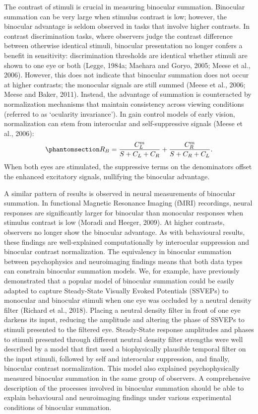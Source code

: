 \documentclass[
  12pt,
]{article}
\begin{document}
The contrast of stimuli is crucial in measuring binocular summation.
Binocular summation can be very large when stimulus contrast is low;
however, the binocular advantage is seldom observed in tasks that
involve higher contrasts. In contrast discrimination tasks, where
observers judge the contrast difference between otherwise identical
stimuli, binocular presentation no longer confers a benefit in
sensitivity: discrimination thresholds are identical whether stimuli are
shown to one eye or both (Legge, 1984a; Maehara and Goryo, 2005; Meese
et al., 2006). However, this does not indicate that binocular summation
does not occur at higher contrasts; the monocular signals are still
summed (Meese et al., 2006; Meese and Baker, 2011). Instead, the
advantage of summation is counteracted by normalization mechanisms that
maintain consistency across viewing conditions (referred to as
`ocularity invariance'). In gain control models of early vision,
normalization can stem from interocular and self-suppressive signals
(Meese et al., 2006):
\begin{equation}\phantomsection\label{eq-intoMath2}{
R_B = \frac{C_L^m}{S+C_L+C_R} + \frac{C_R^m}{S+C_R+C_L}.
}\end{equation} When both eyes are stimulated, the suppressive terms on
the denominators offset the enhanced excitatory signals, nullifying the
binocular advantage.

A similar pattern of results is observed in neural measurements of
binocular summation. In functional Magnetic Resonance Imaging (fMRI)
recordings, neural responses are significantly larger for binocular than
monocular responses when stimulus contrast is low (Moradi and Heeger,
2009). At higher contrasts, observers no longer show the binocular
advantage. As with behavioural results, these findings are
well-explained computationally by interocular suppression and binocular
contrast normalization. The equivalency in binocular summation between
psychophysics and neuroimaging findings means that both data types can
constrain binocular summation models. We, for example, have previously
demonstrated that a popular model of binocular summation could be easily
adapted to capture Steady-State Visually Evoked Potentials (SSVEPs) to
monocular and binocular stimuli when one eye was occluded by a neutral
density filter (Richard et al., 2018). Placing a neutral density filter
in front of one eye darkens its input, reducing the amplitude and
altering the phase of SSVEPs to stimuli presented to the filtered eye.
Steady-State response amplitudes and phases to stimuli presented through
different neutral density filter strengths were well described by a
model that first used a biophysically plausible temporal filter on the
input stimuli, followed by self and interocular suppression, and
finally, binocular contrast normalization. This model also explained
psychophysically measured binocular summation in the same group of
observers. A comprehensive description of the processes involved in
binocular summation should be able to explain behavioural and
neuroimaging findings under various experimental conditions of binocular
summation.
\end{document}

